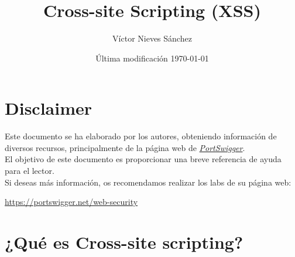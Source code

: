 \documentclass[bibliography=totocnumbered]{scrartcl}
\title{Cross-site Scripting (XSS)}
\author{Víctor Nieves Sánchez}
\date{Última modificación \today{}}
\newcommand{\changeurlcolor}[1]{\hypersetup{urlcolor=#1}}
\begin{document}
\maketitle
\section*{Disclaimer}
Este documento se ha elaborado por los autores, obteniendo información de diversos recursos, principalmente de la página web de \changeurlcolor{blue}\href{https://portswigger.net/web-security}{\textit{PortSwigger}}.\\
\changeurlcolor{black}
El objetivo de este documento es proporcionar una breve referencia de ayuda para el lector.\\

Si deseas más información, os recomendamos realizar los labs de su página web:
\begin{center}
\changeurlcolor{blue}\href{https://portswigger.net/web-security}{https://portswigger.net/web-security}    
\end{center}

\newpage
\tableofcontents

\newpage
\listoffigures

\newpage

\section{¿Qué es Cross-site scripting?}


\newpage
\nocite{*}
\printbibliography 
\end{document}
